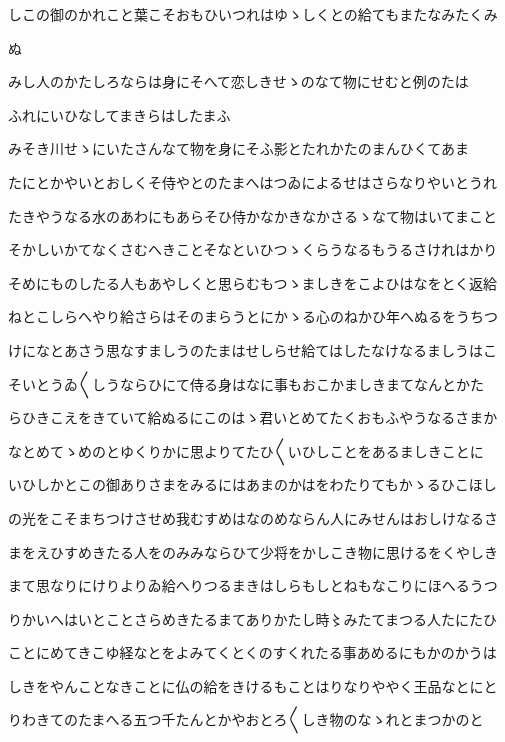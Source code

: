 \documentclass[a4paper,11pt,landscape]{ltjtarticle}
\begin{document}
しこの御のかれこと葉こそおもひいつれはゆゝしくとの給てもまたなみたくみ
\par\medskip
ぬ
\par\medskip
みし人のかたしろならは身にそへて恋しきせゝのなて物にせむと例のたは
\par\medskip
ふれにいひなしてまきらはしたまふ
\par\medskip
みそき川せゝにいたさんなて物を身にそふ影とたれかたのまんひくてあま
\par\medskip
たにとかやいとおしくそ侍やとのたまへはつゐによるせはさらなりやいとうれ
\par\medskip
たきやうなる水のあわにもあらそひ侍かなかきなかさるゝなて物はいてまこと
\par\medskip
そかしいかてなくさむへきことそなといひつゝくらうなるもうるさけれはかり
\par\medskip
そめにものしたる人もあやしくと思らむもつゝましきをこよひはなをとく返給
\par\medskip
ねとこしらへやり給さらはそのまらうとにかゝる心のねかひ年へぬるをうちつ
\par\medskip
けになとあさう思なすましうのたまはせしらせ給てはしたなけなるましうはこ
\par\medskip
そいとうゐ〱しうならひにて侍る身はなに事もおこかましきまてなんとかた
\par\medskip
らひきこえをきていて給ぬるにこのはゝ君いとめてたくおもふやうなるさまか
\par\medskip
なとめてゝめのとゆくりかに思よりてたひ〱いひしことをあるましきことに
\par\medskip
いひしかとこの御ありさまをみるにはあまのかはをわたりてもかゝるひこほし
\par\medskip
の光をこそまちつけさせめ我むすめはなのめならん人にみせんはおしけなるさ
\par\medskip
まをえひすめきたる人をのみみならひて少将をかしこき物に思けるをくやしき
\par\medskip
まて思なりにけりよりゐ給へりつるまきはしらもしとねもなこりにほへるうつ
\par\medskip
りかいへはいとことさらめきたるまてありかたし時〻みたてまつる人たにたひ
\par\medskip
ことにめてきこゆ経なとをよみてくとくのすくれたる事あめるにもかのかうは
\par\medskip
しきをやんことなきことに仏の給をきけるもことはりなりややく王品なとにと
\par\medskip
りわきてのたまへる五つ千たんとかやおとろ〱しき物のなゝれとまつかのと
\par\medskip
\end{document}

